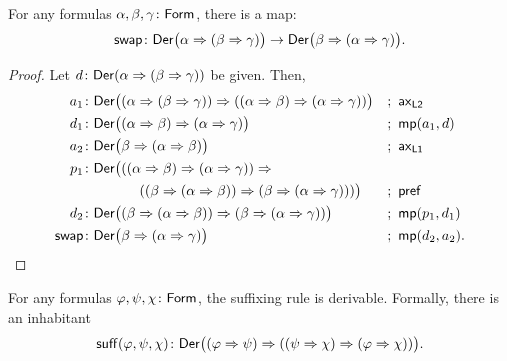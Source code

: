 \begin{lem}
    \label{lem:swap}
    For any formulas\/ $\alpha,\beta,\gamma \colon\fun{Form}$, there is a map:
    \[
        \fun{swap}\colon
            \fun{Der}\bigl(
                \alpha\imp(\beta\imp\gamma)
            \bigr)
            \to
            \fun{Der}\bigl(
                \beta\imp(\alpha\imp\gamma)
            \bigr).
    \]
\end{lem}

\begin{proof}
    Let $d\colon \fun{Der}(\alpha\imp(\beta\imp\gamma))$ be given. Then,
    \begin{align*}
        a_1&\colon\fun{Der}\bigl(
            (\alpha\imp(\beta\imp\gamma))
            \imp
            ((\alpha\imp\beta)\imp(\alpha\imp\gamma))
        \bigr)
            &&;\ \fun{ax}_{\fun{L2}}\\
        d_1&\colon\fun{Der}\bigl(
            (\alpha\imp\beta)\imp(\alpha\imp\gamma)
        \bigr)
            &&;\ \fun{mp}(a_1,d)\\
        a_2&\colon\fun{Der}\bigl(
            \beta\imp(\alpha\imp\beta)
        \bigr)
            &&;\ \fun{ax}_{\fun{L1}}\\
        p_1&\colon\fun{Der}\bigl(
            ((\alpha\imp\beta)\imp(\alpha\imp\gamma))\imp\\
            &\qquad\qquad(
                (\beta\imp(\alpha\imp\beta))
                \imp
                (\beta\imp(\alpha\imp\gamma))
            )
        \bigr)
            &&;\ \fun{pref}\\
        d_2&\colon\fun{Der}\bigl(
            (\beta\imp(\alpha\imp\beta))
            \imp
            (\beta\imp(\alpha\imp\gamma))
        \bigr)
            &&;\ \fun{mp}(p_1,d_1)\\
        \fun{swap}&\colon\fun{Der}\bigl(
            \beta\imp(\alpha\imp\gamma)
        \bigr)
            &&;\ \fun{mp}(d_2,a_2).
    \end{align*}
\end{proof}

\begin{lem}[Suffixing]\label{lem:suffixing}
    For any formulas\/ $\varphi, \psi, \chi \colon \fun{Form}$, the suffixing rule is derivable. Formally, there is an inhabitant
    \[
        \fun{suff}(\varphi,\psi,\chi)\colon\fun{Der}\bigl(
            (\varphi\imp\psi)\imp(
                (\psi\imp\chi)
                \imp
                (\varphi\imp\chi)
            )
        \bigr).
    \]
    \end{lem}
    

